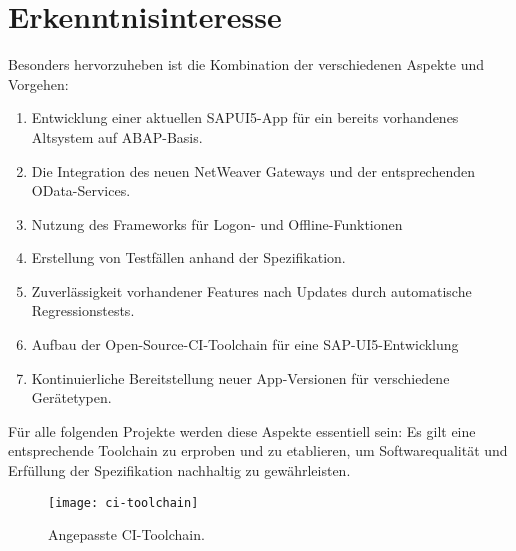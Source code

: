 \section{Erkenntnisinteresse}
Besonders hervorzuheben ist die Kombination der verschiedenen Aspekte und
Vorgehen:

\begin{enumerate}
	\item Entwicklung einer aktuellen SAPUI5-App für ein bereits vorhandenes
	Altsystem auf ABAP-Basis.
	\item Die Integration des neuen NetWeaver Gateways und der entsprechenden
	OData-Services.
	\item Nutzung des Frameworks für Logon- und	Offline-Funktionen
	\item Erstellung von Testfällen anhand der Spezifikation.
	\item Zuverlässigkeit vorhandener Features nach Updates durch automatische
	Regressionstests.
	\item Aufbau der Open-Source-CI-Toolchain für eine SAP-UI5-Entwicklung
	\item Kontinuierliche Bereitstellung neuer App-Versionen für
	verschiedene Gerätetypen.
\end{enumerate}

Für alle folgenden Projekte werden diese Aspekte essentiell sein: Es gilt eine
entsprechende Toolchain zu erproben und zu etablieren, um
Softwarequalität und Erfüllung der Spezifikation nachhaltig zu gewährleisten.

\begin{figure}
	\centering
	\texttt{[image: ci-toolchain]}
	\caption{Angepasste CI-Toolchain.}
	\label{fig:CI-Toolchain}
\end{figure}